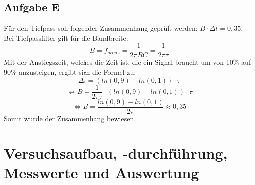 \documentclass{article}
\begin{document}
\subsection*{Aufgabe E}
\label{subsec:afgE}
Für den Tiefpass soll folgender Zusammenhang geprüft werden:  $B\cdot \Delta t = 0,35$.\\
Bei Tiefpassfilter gilt für die Bandbreite: 
\begin{equation}
    B = f_{grenz} = \frac{1}{2\pi RC} = \frac{1}{2\pi \tau}
\end{equation}
Mit der Anstiegszeit, welches die Zeit ist, die ein Signal braucht um von 10\% auf 90\% anzusteigen, ergibt sich die Formel zu: \\
 \begin{equation*}
     \Delta t = (ln(0,9)-ln(0,1))\cdot \tau 
 \end{equation*}
 \begin{equation*}
     \iff B = \frac{1}{2\pi \tau} \cdot (ln(0,9)-ln(0,1))\cdot \tau 
 \end{equation*}
 \begin{equation*}
     \iff B = \frac{ln(0,9)-ln(0,1)}{2 \pi} \approx 0,35
 \end{equation*}
 Somit wurde der Zusammenhang bewiesen. 

 \section{Versuchsaufbau, -durchführung, Messwerte und Auswertung}
\end{document}
